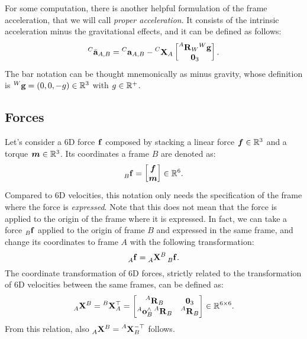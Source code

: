 \begin{addmargin}{0cm}
For some computation, there is another helpful formulation of the frame acceleration, that we will call \emph{proper acceleration}.
It consists of the intrinsic acceleration minus the gravitational effects, and it can be defined as follows:
%
\begin{equation}
    \label{eq:sixd_proper_acceleration}
    {}^C \bar{\mathbf{a}}_{A,B} = \accsix[C]_{A,B} - \transvel[C]_A
    \begin{bmatrix}
        \rot[A]_W {}^W \mathbf{g} \\ \zeros_3
    \end{bmatrix}
    .
\end{equation}
%
The bar notation can be thought mnemonically as minus gravity, whose definition is ${}^W \mathbf{g} = (0, 0, -g) \in \realn^3$ with $g \in \realn^+$.

\subsection{Forces}

Let's consider a 6D force $\forcesix$ composed by stacking a linear force $\forcelin \in \realn^3$ and a torque $\forceang \in \realn^3$.
Its coordinates \wrtl a frame $B$ are denoted as:
%
\begin{equation*}
    \forcesix[B] =
    \begin{bmatrix}
        \forcelin \\ \forceang
    \end{bmatrix}
    \in \realn^6
    .
\end{equation*}
%
Compared to 6D velocities, this notation only needs the specification of the frame where the force is \emph{expressed}.
Note that this does not mean that the force is applied to the origin of the frame where it is expressed.
In fact, we can take a force $\forcesix[B]$ applied to the origin of frame $B$ and expressed in the same frame, and change its coordinates to frame $A$ with the following transformation:
%
\begin{equation}
    \label{eq:sixd_force_transformation}
    \forcesix[A] = \transfor[A]^B \forcesix[B]
    .
\end{equation}
%
The coordinate transformation of 6D forces, strictly related to the transformation of 6D velocities between the same frames, can be defined as:
%
\begin{equation*}
    \transfor[A]^B = \transvel[B]_A^\top =
    \begin{bmatrix}
        \rot[A]_B & \zeros_{3\time3} \\
        \ori[A]_B^\wedge \rot[A]_B & \rot[A]_B
    \end{bmatrix}
    \in \realn^{6\times6}
    .
\end{equation*}
%
From this relation, also $\transfor[A]^B = \transvel[A]_B^{-\top}$ follows.


\end{addmargin}

